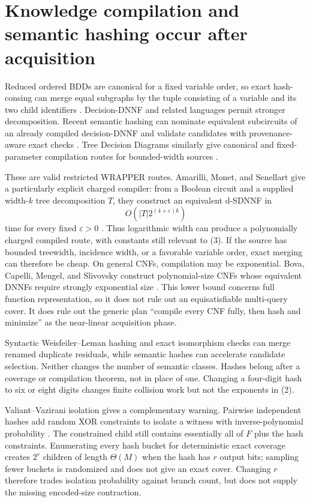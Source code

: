 \documentclass[11pt]{article}
\begin{document}
\section{Knowledge compilation and semantic hashing occur after acquisition}

Reduced ordered BDDs are canonical for a fixed variable order, so exact
hash-consing can merge equal subgraphs by the tuple consisting of a variable
and its two child identifiers \cite{bryant1986}.  Decision-DNNF and related
languages permit stronger decomposition.  Recent semantic hashing can
nominate equivalent subcircuits of an already compiled decision-DNNF and
validate candidates with provenance-aware exact checks
\cite{bierelagniezlonca2026}.  Tree Decision Diagrams similarly give
canonical and fixed-parameter compilation routes for bounded-width sources
\cite{capelli2026}.

These are valid restricted WRAPPER routes.  Amarilli, Monet, and Senellart
give a particularly explicit charged compiler: from a Boolean circuit and a
supplied width-$k$ tree decomposition $T$, they construct an equivalent
d-SDNNF in
\[
 O\!\left(|T|2^{(4+\varepsilon)k}\right)
\]
time for every fixed $\varepsilon>0$ \cite{amarillimonetsenellart2018}.
Thus logarithmic width can produce a polynomially charged compiled route,
with constants still relevant to (3).  If the source has bounded treewidth,
incidence width, or a favorable variable order, exact merging can therefore
be cheap.
On general CNFs, compilation may be exponential.  Bova, Capelli, Mengel, and
Slivovsky construct polynomial-size CNFs whose equivalent DNNFs require
strongly exponential size \cite{bovaetal2016}.  This lower bound concerns
full function representation, so it does not rule out an equisatisfiable
multi-query cover.  It does rule out the generic plan ``compile every CNF
fully, then hash and minimize'' as the near-linear acquisition phase.

Syntactic Weisfeiler--Leman hashing and exact isomorphism checks can merge
renamed duplicate residuals, while semantic hashes can accelerate candidate
selection.  Neither changes the number of semantic classes.  Hashes belong
after a coverage or compilation theorem, not in place of one.  Changing a
four-digit hash to six or eight digits changes finite collision work but not
the exponents in (2).

Valiant--Vazirani isolation gives a complementary warning.  Pairwise
independent hashes add random XOR constraints to isolate a witness with
inverse-polynomial probability \cite{valiantvazirani1986}.  The constrained
child still contains essentially all of $F$ plus the hash constraints.
Enumerating every hash bucket for deterministic exact coverage creates
$2^r$ children of length $\Theta(M)$ when the hash has $r$ output bits;
sampling fewer buckets is randomized and does not give an exact cover.
Changing $r$ therefore trades isolation probability against branch count,
but does not supply the missing encoded-size contraction.
\end{document}
